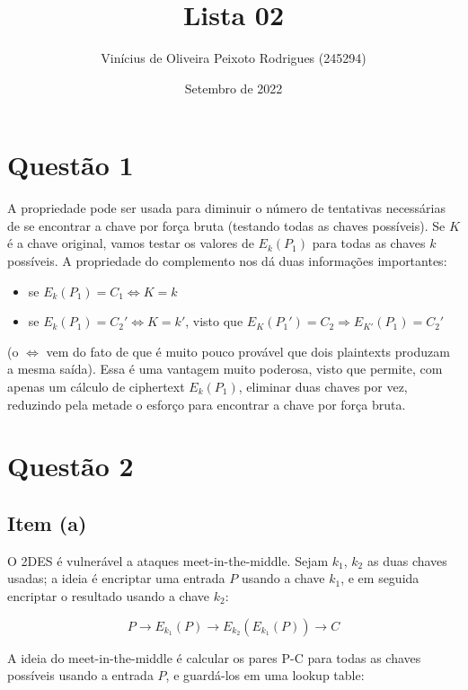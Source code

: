 \documentclass{article}
\title{Lista 02}
\author{Vinícius de Oliveira Peixoto Rodrigues (245294)}
\date{Setembro de 2022}
\begin{document}
\maketitle

\section*{Questão 1}

A propriedade pode ser usada para diminuir o número de tentativas necessárias de se encontrar a chave por força bruta (testando todas as chaves possíveis). Se $K$ é a chave original, vamos testar os valores de $E_k(P_1)$ para todas as chaves $k$ possíveis. A propriedade do complemento nos dá duas informações importantes:

\begin{itemize}
    \item se $E_k(P_1) = C_1 \Leftrightarrow K = k$
    \item se $E_k(P_1) = C_2' \Leftrightarrow K = k'$, visto que $E_K(P_1') = C_2 \Rightarrow E_{K'}(P_1) = C_2'$
\end{itemize}

(o $\Leftrightarrow$ vem do fato de que é muito pouco provável que dois plaintexts produzam a mesma saída). Essa é uma vantagem muito poderosa, visto que permite, com apenas um cálculo de ciphertext $E_k(P_1)$, eliminar duas chaves por vez, reduzindo pela metade o esforço para encontrar a chave por força bruta.

\section*{Questão 2}

\subsection*{Item (a)}

O 2DES é vulnerável a ataques meet-in-the-middle. Sejam $k_1$, $k_2$ as duas chaves usadas; a ideia é encriptar uma entrada $P$ usando a chave $k_1$, e em seguida encriptar o resultado usando a chave $k_2$:

\begin{equation*}
    P \rightarrow E_{k_1}(P) \rightarrow E_{k_2}(E_{k_1}(P)) \rightarrow C
\end{equation*}

A ideia do meet-in-the-middle é calcular os pares P-C para todas as chaves possíveis usando a entrada $P$, e guardá-los em uma lookup table:
\end{document}
